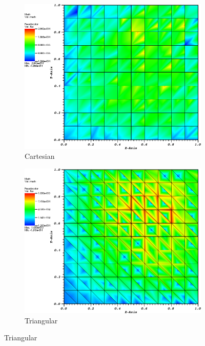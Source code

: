 \begin{figure}
\centering
{
	\begin{subfigure}[b]{0.465\textwidth}
		\centering
		\label{subfig::cart_me_k2_lin_sol}
		\includegraphics[width=\textwidth]{figures/sec_BF/quad_err_cart_ME2.png}
		\caption{Cartesian}
	\end{subfigure}
	\hfill
	\begin{subfigure}[b]{0.465\textwidth}
		\centering
		\label{subfig::tri_me_k2_lin_sol}
		\includegraphics[width=\textwidth]{figures/sec_BF/quad_err_tri_ME2.png}
		\caption{Triangular}

\end{subfigure}}
\end{figure}
